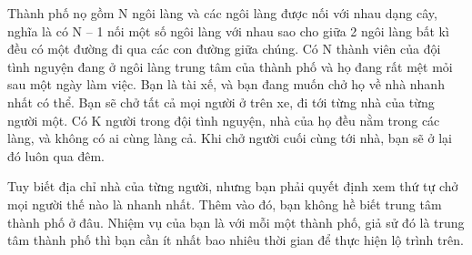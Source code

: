 Thành phố nọ gồm N ngôi làng và các ngôi làng được nối với nhau dạng cây, nghĩa là có N – 1 nối một số ngôi làng với nhau sao cho giữa 2 ngôi làng bất kì đều có một đường đi qua các con đường giữa chúng. Có N thành viên của đội tình nguyện đang ở ngôi làng trung tâm của thành phố và họ đang rất mệt mỏi sau một ngày làm việc. Bạn là tài xế, và bạn đang muốn chở họ về nhà nhanh nhất có thể. Bạn sẽ chở tất cả mọi người ở trên xe, đi tới từng nhà của từng người một. Có K người trong đội tình nguyện, nhà của họ đều nằm trong các làng, và không có ai cùng làng cả. Khi chở người cuối cùng tới nhà, bạn sẽ ở lại đó luôn qua đêm.  

   Tuy biết địa chỉ nhà của từng người, nhưng bạn phải quyết định xem thứ tự chở mọi người thế nào là nhanh nhất. Thêm vào đó, bạn không hề biết trung tâm thành phố ở đâu. Nhiệm vụ của bạn là với mỗi một thành phố, giả sử đó là trung tâm thành phố thì bạn cần ít nhất bao nhiêu thời gian để thực hiện lộ trình trên.  

\